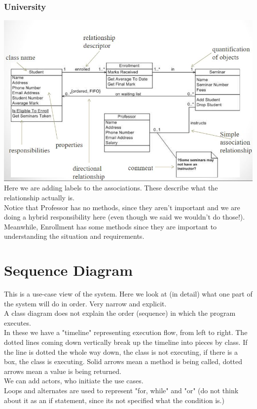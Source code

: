 \documentclass[12pt]{article}
\theoremstyle{definition}
\begin{document}
\subsubsection{University}
\includegraphics[]{university}
\\
Here we are adding labels to the associations. These describe what the relationship actually is. 
\\ \linebreak
Notice that Professor has no methods, since they aren't important and we are doing a hybrid responsibility here (even though we said we wouldn't do those!). Meanwhile, Enrollment has some methods since they are important to understanding the situation and requirements.
\\ \linebreak

\section{Sequence Diagram}
This is a use-case view of the system. Here we look at (in detail) what one part of the system will do in order. Very narrow and explicit.
\\ \linebreak
A class diagram does not explain the order (sequence) in which the program executes.
\\ \linebreak
In these we have a "timeline" representing execution flow, from left to right. The dotted lines coming down vertically break up the timeline into pieces by class. If the line is dotted the whole way down, the class is not executing, if there is a box, the class is executing. Solid arrows mean a method is being called, dotted arrows mean a value is being returned.
\\ \linebreak
We can add actors, who initiate the use cases.
\\ \linebreak
Loops and alternates are used to represent "for, while" and "or" (do not think about it as an if statement, since its not specified what the condition is.)
\\ \linebreak
\end{document}
